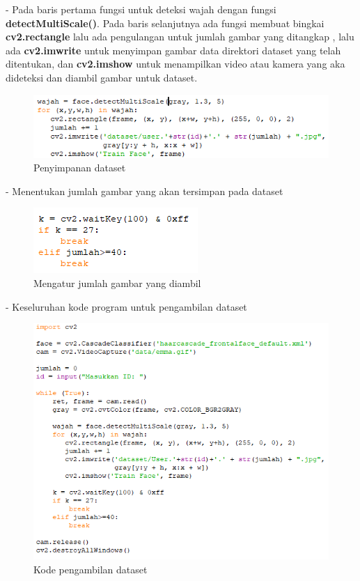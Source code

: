 \begin{enumerate}[1.]
- Pada baris pertama fungsi untuk deteksi wajah dengan fungsi \textbf{detectMultiScale()}. 
Pada baris selanjutnya ada fungsi membuat bingkai \textbf{cv2.rectangle} lalu ada pengulangan untuk jumlah gambar yang ditangkap
, lalu ada \textbf{cv2.imwrite} untuk menyimpan gambar data direktori dataset yang telah ditentukan, dan \textbf{cv2.imshow} untuk 
menampilkan video atau kamera yang aka dideteksi dan diambil gambar untuk dataset.
\begin{figure}[h!]
    \centering
    \includegraphics[width=0.85\linewidth]{images/fr_5.PNG}
    \caption{Penyimpanan dataset}
\end{figure}

- Menentukan jumlah gambar yang akan tersimpan pada dataset
\begin{figure}[h!]
    \centering
    \includegraphics[width=0.5\linewidth]{images/fr_6.PNG}
    \caption{Mengatur jumlah gambar yang diambil}
\end{figure}
\newpage
- Keseluruhan kode program untuk pengambilan dataset
\begin{figure}[h!]
    \centering
    \includegraphics[width=0.85\linewidth]{images/fr_full.PNG}
    \caption{Kode pengambilan dataset}
\end{figure}


\end{enumerate}
